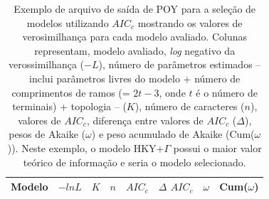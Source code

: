 \begin{refsection}

\scriptsize 
\begin{table}[H]
\caption[Seleção de modelos em POY]{Exemplo de arquivo de saída de POY para a seleção de modelos utilizando $AIC_{c}$ mostrando os valores de verosimilhança para cada modelo avaliado. Colunas representam, modelo avaliado, \textit{log} negativo da verossimilhança ($-L$), número de parâmetros estimados -- inclui parâmetros livres do modelo + número de comprimentos de ramos (= $2t-3$, onde $t$ é o número de terminais) + topologia -- ($K$), número de caracteres ($n$), valores de $AIC_{c}$, diferença entre valores de $AIC_{c}$ ($\Delta$), pesos de Akaike ($\omega$) e peso acumulado de Akaike (Cum($\omega$)).  Neste exemplo, o modelo HKY+$\Gamma$ possui o maior valor teórico de informação e seria o modelo selecionado.} \label{tut13:table:modsel}
\begin{center}
\begin{tabular}{llllllll}
\hline
\multicolumn{1}{c}{\textbf{Modelo}}&
\multicolumn{1}{c}{\textbf{$-lnL$}}&
\multicolumn{1}{c}{\textbf{$K$}}&
\multicolumn{1}{c}{\textbf{$n$}}&
\multicolumn{1}{c}{\textbf{$AIC_{c}$}}&
\multicolumn{1}{c}{\textbf{$\Delta$ $AIC_{c}$}}&
\multicolumn{1}{c}{\textbf{$\omega$}}&
\multicolumn{1}{c}{\textbf{Cum($\omega$)}}\\
\hline\hline


\end{tabular}
\end{center}
\end{table}
\end{refsection}
